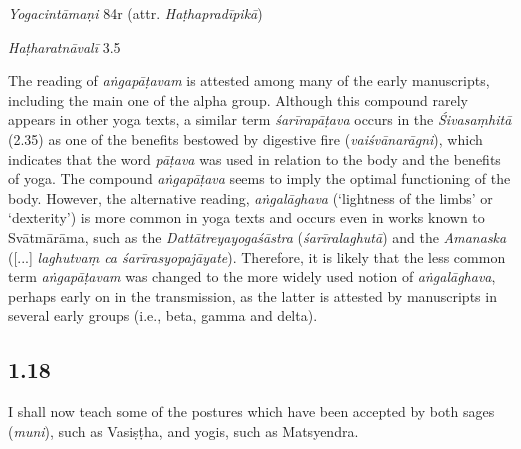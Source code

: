 \begin{ekdosis}
\begin{testimonia}[hp01_017]
\emph{Yogacintāmaṇi} 84r (attr. \emph{Haṭhapradīpikā})

\begin{versinnote}
\end{versinnote}

\emph{Haṭharatnāvalī} 3.5

\begin{versinnote}
\end{versinnote}

\end{testimonia}

\begin{philcomm}[hp01_017]        
The reading of \emph{aṅgapāṭavam} is attested among many of the early manuscripts, including the main one of the alpha group. Although this compound rarely appears in other yoga texts, a similar term \emph{śarīrapāṭava} occurs in the \emph{Śivasaṃhitā} (2.35) as one of the benefits bestowed by digestive fire (\emph{vaiśvānarāgni}), which indicates that the word \emph{pāṭava} was used in relation to the body and the benefits of yoga. The compound \emph{aṅgapāṭava} seems to imply the optimal functioning of the body. However, the alternative reading, \emph{aṅgalāghava} (‘lightness of the limbs’ or ‘dexterity’) is more common in yoga texts and occurs even in works known to Svātmārāma, such as the \emph{Dattātreyayogaśāstra} (\emph{śarīralaghutā}) and the \textit{Amanaska} ([...] \emph{laghutvaṃ ca śarīrasyopajāyate}). Therefore, it is likely that the less common term \emph{aṅgapāṭavam} was changed to the more widely used notion of \emph{aṅgalāghava}, perhaps early on in the transmission, as the latter is attested by manuscripts in several early groups (i.e., beta, gamma and delta).
\end{philcomm}

\subsection*{1.18}
\begin{translation}[hp01_018]
I shall now teach some of the postures which have been accepted by both sages (\emph{muni}), such as Vasiṣṭha, and yogis, such as Matsyendra.
\end{translation}


\end{ekdosis}
